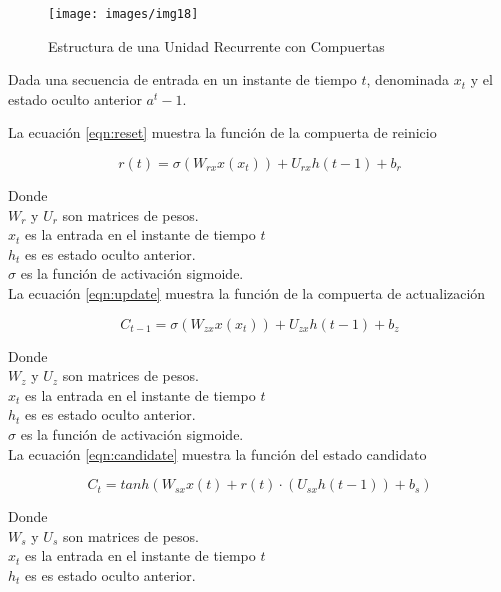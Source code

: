    \begin{figure}[!ht]
        \centering
        \texttt{[image: images/img18]}
        \caption{Estructura de una Unidad Recurrente con Compuertas \citep[p. 20]{bib23}}
        \label{fig:GRU}
    \end{figure}

    Dada una secuencia de entrada en un instante de tiempo $t$, denominada $x_t$ y el estado oculto anterior $a^t-1$. 

    La ecuación \ref{eqn:reset} muestra la función de la compuerta de reinicio 

    \begin{equation}
        r(t) = \sigma(W_{rx}x(x_t)) + U_{rx}h(t-1) + b_r
        \label{eqn:reset}
    \end{equation}

    Donde\\ 
    $W_r $ y $U_r$ son matrices de pesos.\\
    $x_t$ es la entrada en el instante de tiempo $t$\\
    $h_t$ es es estado oculto anterior.\\
    $\sigma$ es la función de activación sigmoide.\\

    La ecuación \ref{eqn:update} muestra la función de la compuerta de actualización

\begin{equation}
        C_{t-1} = \sigma(W_{zx}x(x_t)) + U_{zx}h(t-1) + b_z
        \label{eqn:update}
    \end{equation}

    Donde\\ 
    $W_z $ y $U_z$ son matrices de pesos.\\
    $x_t$ es la entrada en el instante de tiempo $t$\\
    $h_t$ es es estado oculto anterior.\\
    $\sigma$ es la función de activación sigmoide.\\

    La ecuación \ref{eqn:candidate} muestra la función del estado candidato

\begin{equation}
        C_t =tanh(W_{sx}x(t) + r(t) \cdot (U_{sx}h(t-1)) + b_s)
        \label{eqn:candidate}
    \end{equation}

    Donde\\
    $W_s $ y $U_s$ son matrices de pesos.\\
    $x_t$ es la entrada en el instante de tiempo $t$\\
    $h_t$ es es estado oculto anterior.\\

